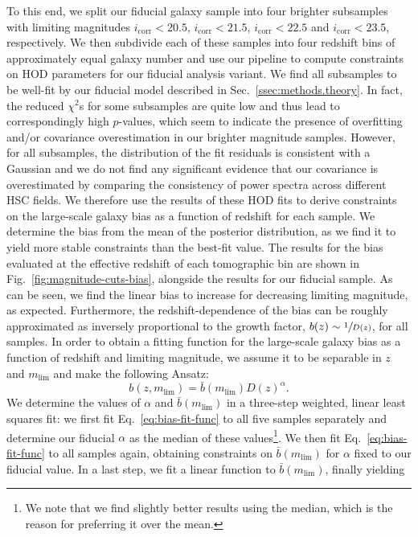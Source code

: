 \documentclass[a4paper,11pt]{article}
\begin{document}
To this end, we split our fiducial galaxy sample into four brighter subsamples with limiting magnitudes $i_{\mathrm{corr}} < 20.5$, $i_{\mathrm{corr}} < 21.5$, $i_{\mathrm{corr}} < 22.5$ and $i_{\mathrm{corr}} < 23.5$, respectively. We then subdivide each of these samples into four redshift bins of approximately equal galaxy number and use our pipeline to compute constraints on HOD parameters for our fiducial analysis variant. We find all subsamples to be well-fit by our fiducial model described in Sec.~\ref{ssec:methods.theory}. In fact, the reduced $\chi^{2}$s for some subsamples are quite low and thus lead to correspondingly high $p$-values, which seem to indicate the presence of overfitting and/or covariance overestimation in our brighter magnitude samples. However, for all subsamples, the distribution of the fit residuals is consistent with a Gaussian and we do not find any significant evidence that our covariance is overestimated by comparing the consistency of power spectra across different HSC fields. We therefore use the results of these HOD fits to derive constraints on the large-scale galaxy bias as a function of redshift for each sample. We determine the bias from the mean of the posterior distribution, as we find it to yield more stable constraints than the best-fit value. The results for the bias evaluated at the effective redshift of each tomographic bin are shown in Fig.~\ref{fig:magnitude-cuts-bias}, alongside the results for our fiducial sample. As can be seen, we find the linear bias to increase for decreasing limiting magnitude, as expected. Furthermore, the redshift-dependence of the bias can be roughly approximated as inversely proportional to the growth factor, $b(z) \sim \sfrac{1}{D(z)}$, for all samples. In order to obtain a fitting function for the large-scale galaxy bias as a function of redshift and limiting magnitude, we assume it to be separable in $z$ and $m_{\mathrm{lim}}$ and make the following Ansatz:
\begin{equation}
b(z, m_{\mathrm{lim}}) = \bar{b}(m_{\mathrm{lim}}) D(z)^{\alpha}.
\label{eq:bias-fit-func}
\end{equation}  
We determine the values of $\alpha$ and $\bar{b}(m_{\mathrm{lim}})$ in a three-step weighted, linear least squares fit: we first fit Eq.~\ref{eq:bias-fit-func} to all five samples separately and determine our fiducial $\alpha$ as the median of these values\footnote{We note that we find slightly better results using the median, which is the reason for preferring it over the mean.}. We then fit Eq.~\ref{eq:bias-fit-func} to all samples again, obtaining constraints on $\bar{b}(m_{\mathrm{lim}})$ for $\alpha$ fixed to our fiducial value. In a last step, we fit a linear function to $\bar{b}(m_{\mathrm{lim}})$, finally yielding
\end{document}
